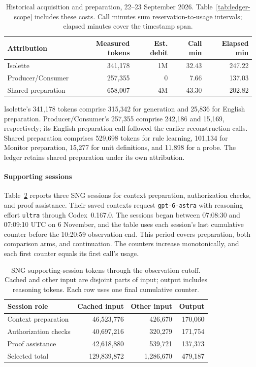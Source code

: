 \begin{table}[!htbp]
\caption{Historical acquisition and preparation, 22--23 September 2026. Table~\ref{tab:ledger-scope} includes these costs. Call minutes sum reservation-to-usage intervals; elapsed minutes cover the timestamp span.}
\label{tab:historical-cost}
\centering\small
\begin{tabular}{@{}p{.28\linewidth}rrrr@{}}
\hline
Attribution & Measured tokens & Est. debit & Call min & Elapsed min \\
\hline
Isolette & 341,178 & 1M & 32.43 & 247.22 \\
Producer/Consumer & 257,355 & 0 & 7.66 & 137.03 \\
Shared preparation & 658,007 & 4M & 43.30 & 202.82 \\
\hline
\end{tabular}
\end{table}

Isolette's 341,178 tokens comprise 315,342 for generation and 25,836 for English preparation. Producer/Consumer's 257,355 comprise 242,186 and 15,169, respectively; its English-preparation call followed the earlier reconstruction calls. Shared preparation comprises 529,698 tokens for rule learning, 101,134 for Monitor preparation, 15,277 for unit definitions, and 11,898 for a probe. The ledger retains shared preparation under its own attribution.

\paragraph{Supporting sessions}
Table~\ref{tab:support-usage} reports three SNG sessions for context preparation, authorization checks, and proof assistance. Their saved contexts request \texttt{gpt-6-astra} with reasoning effort \texttt{ultra} through Codex~0.167.0. The sessions began between 07:08:30 and 07:09:10 UTC on 6 November, and the table uses each session's last cumulative counter before the 10:20:59 observation end. This period covers preparation, both comparison arms, and continuation. The counters increase monotonically, and each first counter equals its first call's usage.

\begin{table}[!htbp]
\caption{SNG supporting-session tokens through the observation cutoff. Cached and other input are disjoint parts of input; output includes reasoning tokens. Each row uses one final cumulative counter.}
\label{tab:support-usage}
\centering\small
\begin{tabular}{@{}p{.30\linewidth}rrr@{}}
\hline
Session role & Cached input & Other input & Output \\
\hline
Context preparation & 46,523,776 & 426,670 & 170,060 \\
Authorization checks & 40,697,216 & 320,279 & 171,754 \\
Proof assistance & 42,618,880 & 539,721 & 137,373 \\
\hline
Selected total & 129,839,872 & 1,286,670 & 479,187 \\
\hline
\end{tabular}
\end{table}

